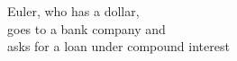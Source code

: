\documentclass[preview]{standalone}
\begin{document}
\begin{center}
Euler, who has a dollar, \\ goes to a bank company and \\ asks for a loan under compound interest
\end{center}
\end{document}
